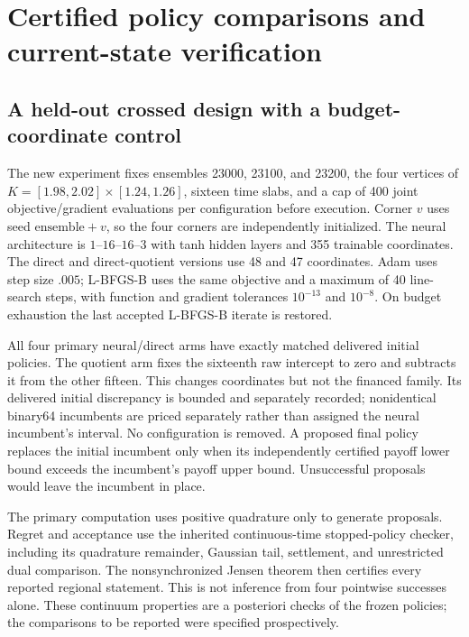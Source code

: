 \section{Certified policy comparisons and current-state verification}\label{sec:r23results}
\subsection{A held-out crossed design with a budget-coordinate control}
The new experiment fixes ensembles 23000, 23100, and 23200, the four vertices of $K=[1.98,2.02]\times[1.24,1.26]$, sixteen time slabs, and a cap of 400 joint objective/gradient evaluations per configuration before execution. Corner $v$ uses seed $\mathrm{ensemble}+v$, so the four corners are independently initialized. The neural architecture is $1$--$16$--$16$--$3$ with tanh hidden layers and 355 trainable coordinates. The direct and direct-quotient versions use 48 and 47 coordinates. Adam uses step size $.005$; L-BFGS-B uses the same objective and a maximum of 40 line-search steps, with function and gradient tolerances $10^{-13}$ and $10^{-8}$. On budget exhaustion the last accepted L-BFGS-B iterate is restored.

All four primary neural/direct arms have exactly matched delivered initial policies. The quotient arm fixes the sixteenth raw intercept to zero and subtracts it from the other fifteen. This changes coordinates but not the financed family. Its delivered initial discrepancy is bounded and separately recorded; nonidentical binary64 incumbents are priced separately rather than assigned the neural incumbent's interval. No configuration is removed. A proposed final policy replaces the initial incumbent only when its independently certified payoff lower bound exceeds the incumbent's payoff upper bound. Unsuccessful proposals would leave the incumbent in place.

The primary computation uses positive quadrature only to generate proposals. Regret and acceptance use the inherited continuous-time stopped-policy checker, including its quadrature remainder, Gaussian tail, settlement, and unrestricted dual comparison. The nonsynchronized Jensen theorem then certifies every reported regional statement. This is not inference from four pointwise successes alone. These continuum properties are a posteriori checks of the frozen policies; the comparisons to be reported were specified prospectively.



